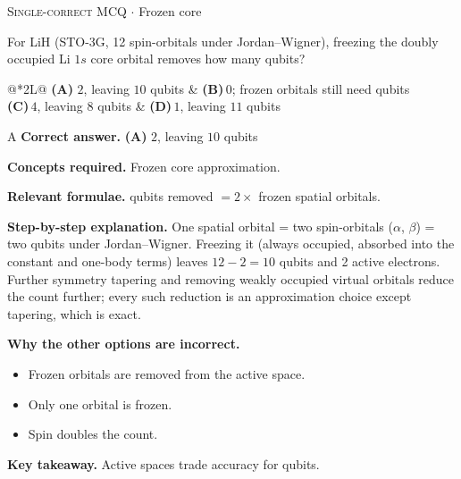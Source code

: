 \documentclass[11pt,a4paper]{article}
\newcommand{\optlabel}[1]{\textbf{(#1)}}
\newcommand{\correctlabel}[1]{\textcolor{okgreen}{\textbf{(#1)}\,\ding{51}}}
\newenvironment{qitem}[1]{\begin{list}{}{\setlength{\leftmargin}{3.3em}\setlength{\labelwidth}{3.1em}%
  \setlength{\labelsep}{0.2em}\setlength{\topsep}{3pt}\setlength{\parsep}{3pt}}\item[\textbf{Q.#1}\hfill]}{\end{list}}
\newcommand{\qsep}{\par\vspace{2pt}{\color{black!15}\hrule}\vspace{4pt}}
\newcommand{\qmeta}[2]{{\footnotesize\color{black!60}\textsc{#1} \;$\cdot$\; #2}\par}
\begin{document}
\begin{qitem}{77}
\qmeta{Single-correct MCQ}{Frozen core}
For LiH (STO-3G, 12 spin-orbitals under Jordan--Wigner), freezing the doubly occupied Li $1s$ core orbital removes how many qubits?
\par\smallskip\noindent\begin{tabularx}{\linewidth}{@{}*{2}{L}@{}}
\correctlabel{A}\,$2$, leaving $10$ qubits & \optlabel{B}\,$0$; frozen orbitals still need qubits \\[3pt]
\optlabel{C}\,$4$, leaving $8$ qubits & \optlabel{D}\,$1$, leaving $11$ qubits
\end{tabularx}
\end{qitem}
\begin{solbox}{A}
\textbf{\color{brand}Correct answer.} \textcolor{okgreen}{\textbf{(A)}} $2$, leaving $10$ qubits

\textbf{\color{brand}Concepts required.} Frozen core approximation.

\textbf{\color{brand}Relevant formulae.} qubits removed $= 2\times$ frozen spatial orbitals.

\textbf{\color{brand}Step-by-step explanation.} One spatial orbital = two spin-orbitals ($\alpha$, $\beta$) = two qubits under Jordan--Wigner. Freezing it (always occupied, absorbed into the constant and
one-body terms) leaves $12 - 2 = 10$ qubits and 2 active electrons. Further symmetry tapering and removing weakly occupied virtual orbitals reduce the
count further; every such reduction is an approximation choice except tapering, which is exact.

\textbf{\color{brand}Why the other options are incorrect.}
\begin{itemize}[leftmargin=2.4em, itemsep=1pt, topsep=2pt]
\item[\textbf{(B)}] Frozen orbitals are removed from the active space.
\item[\textbf{(C)}] Only one orbital is frozen.
\item[\textbf{(D)}] Spin doubles the count.
\end{itemize}
\textbf{\color{brand}Key takeaway.} Active spaces trade accuracy for qubits.
\end{solbox}
\qsep
\end{document}
